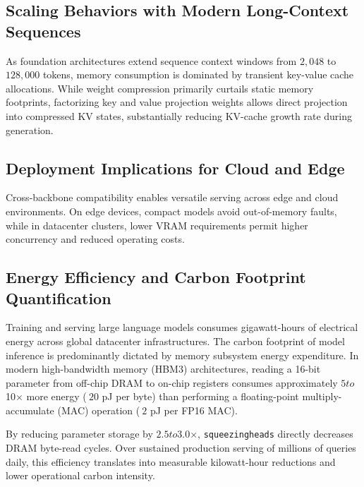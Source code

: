 \subsection{Scaling Behaviors with Modern Long-Context Sequences}
As foundation architectures extend sequence context windows from $2{,}048$ to $128{,}000$ tokens, memory consumption is dominated by transient key-value cache allocations. While weight compression primarily curtails static memory footprints, factorizing key and value projection weights allows direct projection into compressed KV states, substantially reducing KV-cache growth rate during generation.

\subsection{Deployment Implications for Cloud and Edge}
Cross-backbone compatibility enables versatile serving across edge and cloud environments. On edge devices, compact models avoid out-of-memory faults, while in datacenter clusters, lower VRAM requirements permit higher concurrency and reduced operating costs.

\subsection{Energy Efficiency and Carbon Footprint Quantification}
Training and serving large language models consumes gigawatt-hours of electrical energy across global datacenter infrastructures. The carbon footprint of model inference is predominantly dictated by memory subsystem energy expenditure. In modern high-bandwidth memory (HBM3) architectures, reading a 16-bit parameter from off-chip DRAM to on-chip registers consumes approximately $5$\times$ to $10$\times$ more energy ($~20$ pJ per byte) than performing a floating-point multiply-accumulate (MAC) operation ($~2$ pJ per FP16 MAC).

By reducing parameter storage by $2.5$\times$ to $3.0$\times$, \texttt{squeezingheads} directly decreases DRAM byte-read cycles. Over sustained production serving of millions of queries daily, this efficiency translates into measurable kilowatt-hour reductions and lower operational carbon intensity.
